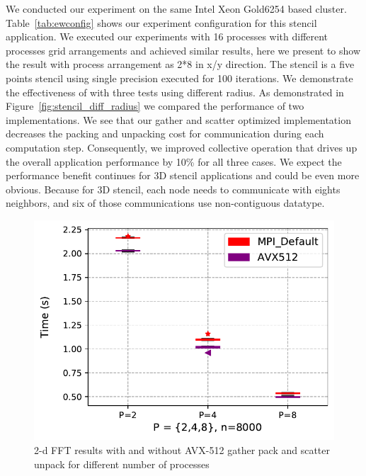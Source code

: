 \documentclass[conference]{IEEEtran}
\begin{document}
We conducted our experiment on the same Intel Xeon Gold6254 based cluster. Table~\ref{tab:ewconfig} shows our experiment configuration for this stencil application.
We executed our experiments with 16 processes with different processes grid arrangements and achieved
similar results, here we present to show the result with process arrangement as 2*8 in x/y direction.
The stencil is a five points stencil using single precision executed for 100 iterations.
We demonstrate the effectiveness of \ourwork with three tests using different radius. As demonstrated in Figure~\ref{fig:stencil_diff_radius} we compared the performance of two implementations. We see that our gather and scatter
optimized implementation decreases the packing and unpacking cost for communication during each computation step.
Consequently, we improved collective operation that drives up the overall application performance by 10\% for all three cases.
We expect the performance benefit continues for 3D stencil applications and could be even more obvious. Because for 3D
stencil, each node needs to communicate with eights neighbors, and six of those communications use non-contiguous datatype.



\begin{figure}[h]
    \centering
    \includegraphics[width=\linewidth]{fft2_diff_p1.pdf}
    \caption{2-d FFT results with and without AVX-512 gather pack and scatter unpack for different number of processes}
    \label{fig:fft2_diff_p}
\end{figure}
\end{document}
